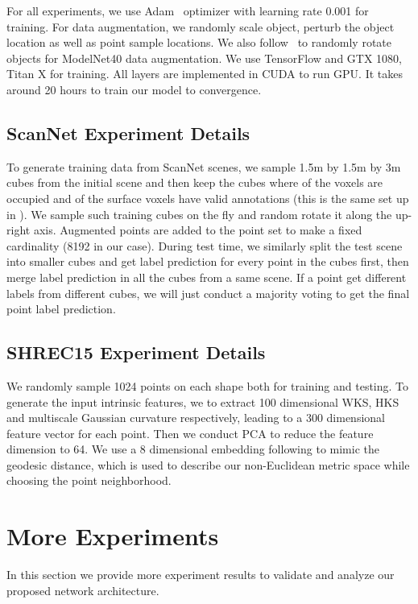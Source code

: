 \documentclass{article}
\begin{document}
For all experiments, we use Adam~\cite{adam} optimizer with learning rate 0.001 for training. For data augmentation, we randomly scale object, perturb the object location as well as point sample locations. We also follow~\cite{qi2016volumetric} to randomly rotate objects for ModelNet40 data augmentation. We use TensorFlow and GTX 1080, Titan X for training. All layers are implemented in CUDA to run GPU. It takes around 20 hours to train our model to convergence.


\subsection{ScanNet Experiment Details}
To generate training data from ScanNet scenes, we sample 1.5m by 1.5m by 3m cubes from the initial scene and then keep the cubes where  of the voxels are occupied and  of the surface voxels have valid annotations (this is the same set up in \cite{dai2017scannet}). We sample such training cubes on the fly and random rotate it along the up-right axis. Augmented points are added to the point set to make a fixed cardinality (8192 in our case). During test time, we similarly split the test scene into smaller cubes and get label prediction for every point in the cubes first, then merge label prediction in all the cubes from a same scene. If a point get different labels from different cubes, we will just conduct a majority voting to get the final point label prediction.

\subsection{SHREC15 Experiment Details}
We randomly sample 1024 points on each shape both for training and testing. To generate the input intrinsic features, we 
to extract 100 dimensional WKS, HKS and multiscale Gaussian curvature respectively, leading to a 300 dimensional feature vector for each point. Then we conduct PCA to reduce the feature dimension to 64. We use a 8 dimensional embedding following \cite{rustamov2009interior} to mimic the geodesic distance, which is used to describe our non-Euclidean metric space while choosing the point neighborhood.

\section{More Experiments}
\label{supp_exp}
In this section we provide more experiment results to validate and analyze our proposed network architecture. 
\end{document}
